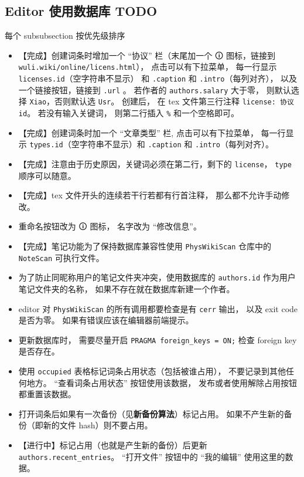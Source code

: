 
\subsection{Editor 使用数据库 TODO}
每个 subsubsection 按优先级排序

\begin{itemize}
\item 【完成】创建词条时增加一个 “协议” 栏（末尾加一个 🛈 图标，链接到 \verb|wuli.wiki/online/licens.html|）， 点击可以有下拉菜单， 每一行显示 \verb|licenses.id|（空字符串不显示） 和 \verb|.caption| 和 \verb|.intro|（每列对齐）， 以及一个链接按钮，链接到 \verb|.url| 。 若作者的 \verb|authors.salary| 大于零， 则默认选择 \verb|Xiao|，否则默认选 \verb|Usr|。 创建后， 在 tex 文件第三行注释 \verb|license: 协议id|。 若没有输入关键词， 则第二行插入 \verb|%| 和一个空格即可。
\item 【完成】创建词条时加一个 “文章类型” 栏, 点击可以有下拉菜单， 每一行显示 \verb|types.id|（空字符串不显示）和 \verb|.caption| 和 \verb|.intro|（每列对齐）。 
\item 【完成】注意由于历史原因，关键词必须在第二行，剩下的 \verb|license|， \verb|type| 顺序可以随意。
\item 【完成】tex 文件开头的连续若干行若都有行首注释， 那么都不允许手动修改。
\item 重命名按钮改为 🛈 图标， 名字改为 “修改信息”。
\item 【完成】笔记功能为了保持数据库兼容性使用 \verb|PhysWikiScan| 仓库中的 \verb|NoteScan| 可执行文件。
\item 为了防止同昵称用户的笔记文件夹冲突，使用数据库的 \verb|authors.id| 作为用户笔记文件夹的名称， 如果不存在就在数据库新建一个作者。
\item editor 对 \verb|PhysWikiScan| 的所有调用都要检查是有 \verb|cerr| 输出， 以及 exit code 是否为零。 如果有错误应该在编辑器前端提示。
\item 更新数据库时， 需要尽量开启 \verb|PRAGMA foreign_keys = ON;| 检查 foreign key 是否存在。
\item 使用 \verb|occupied| 表格标记词条占用状态（包括被谁占用）， 不要记录到其他任何地方。 “查看词条占用状态” 按钮使用该数据， 发布或者使用解除占用按钮都重置该数据。
\item 打开词条后如果有一次备份（见\textbf{新备份算法}）标记占用。 如果不产生新的备份（即新的文件 hash）则不要占用。
\item 【进行中】标记占用（也就是产生新的备份）后更新 \verb|authors.recent_entries|。 “打开文件” 按钮中的 “我的编辑” 使用这里的数据。

\end{itemize}
